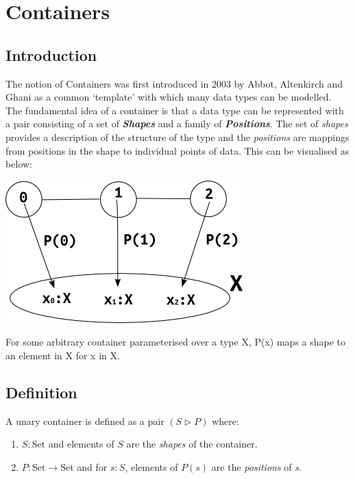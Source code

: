\documentclass[12pt]{report}
\begin{document}
\chapter{Containers}
\section{Introduction}
The notion of Containers was first introduced in 2003 by Abbot, Altenkirch and Ghani\cite{coc} as a common `template' with which many data types can be modelled. The fundamental idea of a container is that a data type can be represented with a pair consisting of a set of \textit{\textbf{Shapes}} and a family of \textit{\textbf{Positions}}. The set of \textit{shapes} provides a description of the structure of the type and the \textit{positions} are mappings from positions in the shape to individual points of data. This can be visualised as below:
\begin{center}
\includegraphics[scale=0.65]{4.png}
\end{center}
For some arbitrary container parameterised over a type X, P(x) maps a shape to an element in X for x in X.
\section{Definition}
A unary container is defined as a pair $ (S \rhd P) $ where:
\begin{enumerate}
\item $S : \text{Set}$ and elements of $S$ are the \textit{shapes} of the container.
\item $P : \text{Set} \to \text{Set}$ and for $s : S$, elements of $P(s)$ are the \textit{positions} of \textit{s}.
\end{enumerate}
\end{document}
